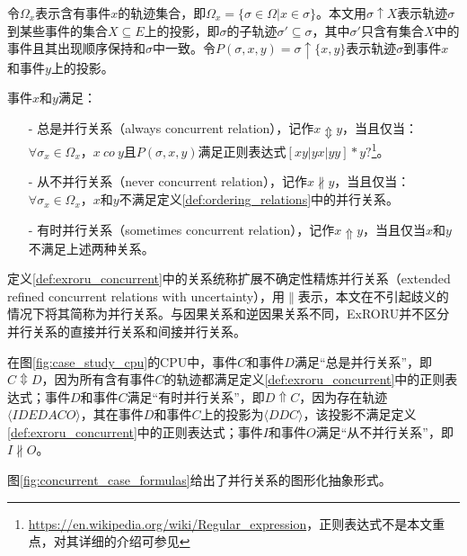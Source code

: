 令$\Omega_{x}$表示含有事件$x$的轨迹集合，即$\Omega_{x}=\{\sigma\in\Omega|x\in\sigma\}$。本文用$\sigma\uparrow X$表示轨迹$\sigma$到某些事件的集合$X\subseteq E$上的投影，即$\sigma$的子轨迹$\sigma'\subseteq\sigma$，其中$\sigma'$只含有集合$X$中的事件且其出现顺序保持和$\sigma$中一致。令$P(\sigma,x,y)=\sigma\uparrow\{x,y\}$表示轨迹$\sigma$到事件$x$和事件$y$上的投影。

\begin{definition}[事件间扩展不确定性精炼并行关系]\label{def:exroru_concurrent}
事件$x$和$y$满足：
  \begin{itemize}
  	\item[-] 总是并行关系（always concurrent relation），记作$x\Updownarrow y$，当且仅当：$\forall\sigma_{x}\in\Omega_{x}$，$x~co~y$且$P(\sigma,x,y)$满足正则表达式$[xy|yx|yy]*y?$\footnote{\url{https://en.wikipedia.org/wiki/Regular\_expression}，正则表达式不是本文重点，对其详细的介绍可参见}。
  	\item[-] 从不并行关系（never concurrent relation），记作$x\nparallel y$，当且仅当：$\forall\sigma_{x}\in\Omega_{x}$，$x$和$y$不满足定义\ref{def:ordering_relations}中的并行关系。
  	\item[-] 有时并行关系（sometimes concurrent relation），记作$x\Uparrow y$，当且仅当$x$和$y$不满足上述两种关系。
  \end{itemize}
\end{definition}

定义\ref{def:exroru_concurrent}中的关系统称扩展不确定性精炼并行关系（extended refined concurrent relations with uncertainty），用$\parallel$表示，本文在不引起歧义的情况下将其简称为并行关系。与因果关系和逆因果关系不同，ExRORU并不区分并行关系的直接并行关系和间接并行关系。

\begin{example}\label{ex:exroru_concurrent}
在图\ref{fig:case_study_cpu}的CPU中，事件$C$和事件$D$满足“总是并行关系”，即$C\Updownarrow D$，因为所有含有事件$C$的轨迹都满足定义\ref{def:exroru_concurrent}中的正则表达式；事件$D$和事件$C$满足“有时并行关系”，即$D\Uparrow C$，因为存在轨迹$\langle IDEDACO\rangle$，其在事件$D$和事件$C$上的投影为$\langle DDC\rangle$，该投影不满足定义\ref{def:exroru_concurrent}中的正则表达式；事件$I$和事件$O$满足“从不并行关系”，即$I\nparallel O$。
\end{example}

图\ref{fig:concurrent_case_formulas}给出了并行关系的图形化抽象形式。

